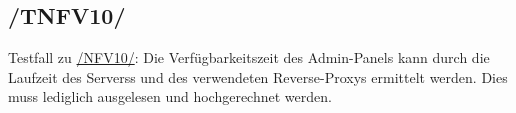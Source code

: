 \subsection*{/TNFV10/}

\label{/TNFV10/} Testfall zu \hyperref[/NFV10/]{/NFV10/}: Die Verfügbarkeitszeit des \Gls{Admin-Panel}s kann durch die Laufzeit des \Glspl{Server}s und des verwendeten \Gls{Reverse-Proxy}s ermittelt werden.
Dies muss lediglich ausgelesen und hochgerechnet werden.